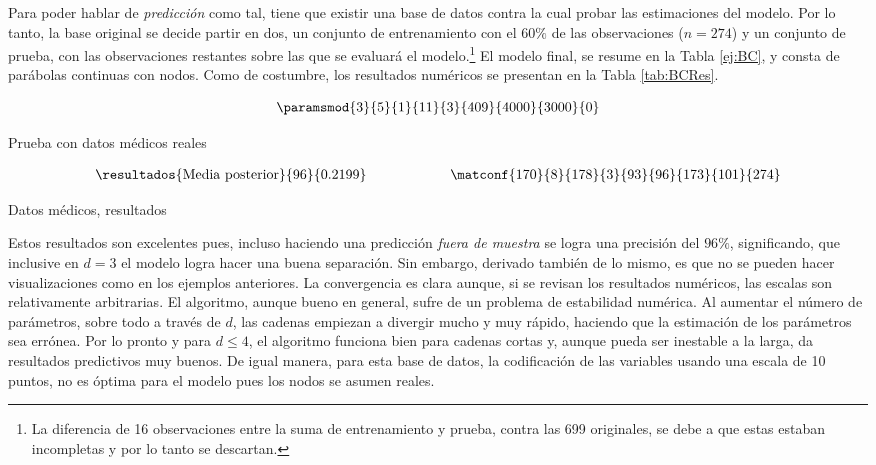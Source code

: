 Para poder hablar de \textit{predicción} como tal, tiene que existir una base de datos contra la cual probar las estimaciones del modelo. Por lo tanto, la base original se decide partir en dos, un conjunto de entrenamiento con el $60\%$ de las observaciones ($n=274$) y un conjunto de prueba, con las observaciones restantes sobre las que se evaluará el modelo.\footnote{La diferencia de 16 observaciones entre la suma de entrenamiento y prueba, contra las 699 originales, se debe a que estas estaban incompletas y por lo tanto se descartan.} El modelo final, se resume en la Tabla \ref{ej:BC}, y consta de parábolas continuas con  nodos. Como de costumbre, los resultados numéricos se presentan en la Tabla \ref{tab:BCRes}.
\begin{table}[h]
$$\paramsmod{3}{5}{1}{11}{3}{409}{4000}{3000}{0}$$
\caption{Prueba con datos médicos reales}
\label{ej:BC}
\end{table}

\begin{table}
\begin{align*}
\resultados{\text{Media posterior}}{96}{0.2199}
\qquad\qquad\qquad
\matconf{170}{8}{178}{3}{93}{96}{173}{101}{274}
\end{align*}
\caption{Datos médicos, resultados}
\label{tab:BCRes}
\end{table}

Estos resultados son excelentes pues, incluso haciendo una predicción \textit{fuera de muestra} se logra una precisión del $96\%$, significando, que inclusive en $d=3$ el modelo logra hacer una buena separación. Sin embargo, derivado también de lo mismo, es que no se pueden hacer visualizaciones como en los ejemplos anteriores. La convergencia es clara aunque, si se revisan los resultados numéricos, las escalas son relativamente arbitrarias. El algoritmo, aunque bueno en general, sufre de un problema de estabilidad numérica. Al aumentar el número de parámetros, sobre todo a través de $d$, las cadenas empiezan a divergir mucho y muy rápido, haciendo que la estimación de los parámetros sea errónea. Por lo pronto y para $d\leq4$, el algoritmo funciona bien para cadenas cortas y, aunque pueda ser inestable a la larga, da resultados predictivos muy buenos. De igual manera, para esta base de datos, la codificación de las variables usando una escala de 10 puntos, no es óptima para el modelo pues los nodos se asumen reales. 